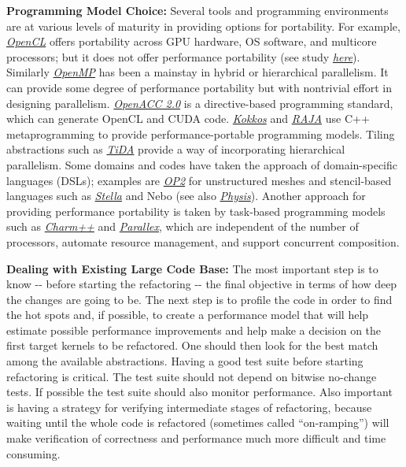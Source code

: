 \documentclass[]{article}
\begin{document}
\textbf{Programming Model Choice:} Several tools and programming
environments are at various levels of maturity in providing options for
portability. For example,
\href{https://www.khronos.org/opencl}{\emph{\emph{OpenCL}}} offers
portability across GPU hardware, OS software, and multicore processors;
but it does not offer performance portability (see study
\href{http://ieeexplore.ieee.org/xpl/login.jsp?tp=\&arnumber=5482576\&url=http\%3A\%2F\%2Fieeexplore.ieee.org\%2Fxpls\%2Fabs_all.jsp\%3Farnumber\%3D5482576}{\emph{here}}).
Similarly \emph{\emph{\href{http://openmp.org/wp/}{OpenMP}}} has been a
mainstay in hybrid or hierarchical parallelism. It can provide some
degree of performance portability but with nontrivial effort in
designing parallelism. \emph{\emph{\href{http://www.openacc.org}{OpenACC
2.0}}} is a directive-based programming standard, which can generate
OpenCL and CUDA code.
\href{http://www.sciencedirect.com/science/article/pii/S0743731514001257}{\emph{\emph{Kokkos}}}
and
\href{https://e-reports-ext.llnl.gov/pdf/782261.pdf}{\emph{\emph{RAJA}}}
use C++ metaprogramming to provide performance-portable programming
models. Tiling abstractions such as
\href{http://sc13.supercomputing.org/sites/default/files/WorkshopsArchive/pdfs/wp118s1.pdf}{\emph{TiDA}}
provide a way of incorporating hierarchical parallelism. Some domains
and codes have taken the approach of domain-specific languages (DSLs);
examples are
\href{https://people.maths.ox.ac.uk/gilesm/files/InPar_OP2.pdf}{\emph{OP2}}
for unstructured meshes and stencil-based languages such as
\href{http://adsabs.harvard.edu/abs/2014EGUGA..16.8464G}{\emph{Stella}}
and Nebo (see also
\href{http://dl.acm.org/citation.cfm?id=2063398}{\emph{Physis}}).
Another approach for providing performance portability is taken by
task-based programming models such as
\href{http://charm.cs.illinois.edu/papers/07-04}{\emph{Charm++}} and
\href{http://stellar.cct.lsu.edu/pubs/icpp09.pdf}{\emph{Parallex}},
which are independent of the number of processors, automate resource
management, and support concurrent composition.

\textbf{Dealing with Existing Large Code Base:} The most important step
is to know -\/- before starting the refactoring -\/- the final objective
in terms of how deep the changes are going to be. The next step is to
profile the code in order to find the hot spots and, if possible, to
create a performance model that will help estimate possible performance
improvements and help make a decision on the first target kernels to be
refactored. One should then look for the best match among the available
abstractions. Having a good test suite before starting refactoring is
critical. The test suite should not depend on bitwise no-change tests.
If possible the test suite should also monitor performance. Also
important is having a strategy for verifying intermediate stages of
refactoring, because waiting until the whole code is refactored
(sometimes called ``on-ramping'') will make verification of correctness
and performance much more difficult and time consuming.
\end{document}
